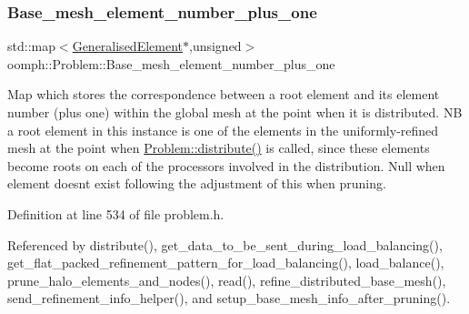 \mbox{\label{classoomph_1_1Problem_a0676b5ce628a0f22f8a7d0330c14d3b4}} 
\subsubsection{\texorpdfstring{Base\+\_\+mesh\+\_\+element\+\_\+number\+\_\+plus\+\_\+one}{Base\_mesh\_element\_number\_plus\_one}}
{\footnotesize\ttfamily std\+::map$<$\hyperlink{classoomph_1_1GeneralisedElement}{Generalised\+Element}$\ast$,unsigned$>$ oomph\+::\+Problem\+::\+Base\+\_\+mesh\+\_\+element\+\_\+number\+\_\+plus\+\_\+one\hspace{0.3cm}{\ttfamily [private]}}



Map which stores the correspondence between a root element and its element number (plus one) within the global mesh at the point when it is distributed. NB a root element in this instance is one of the elements in the uniformly-\/refined mesh at the point when \hyperlink{classoomph_1_1Problem_aa35e1adc0fdf14b217c7b608eb9cf20b}{Problem\+::distribute()} is called, since these elements become roots on each of the processors involved in the distribution. Null when element doesn\textquotesingle{}t exist following the adjustment of this when pruning. 



Definition at line 534 of file problem.\+h.



Referenced by distribute(), get\+\_\+data\+\_\+to\+\_\+be\+\_\+sent\+\_\+during\+\_\+load\+\_\+balancing(), get\+\_\+flat\+\_\+packed\+\_\+refinement\+\_\+pattern\+\_\+for\+\_\+load\+\_\+balancing(), load\+\_\+balance(), prune\+\_\+halo\+\_\+elements\+\_\+and\+\_\+nodes(), read(), refine\+\_\+distributed\+\_\+base\+\_\+mesh(), send\+\_\+refinement\+\_\+info\+\_\+helper(), and setup\+\_\+base\+\_\+mesh\+\_\+info\+\_\+after\+\_\+pruning().

\mbox{\label{classoomph_1_1Problem_a74ce6267ea12fd59903b88e316283b6a}} 
